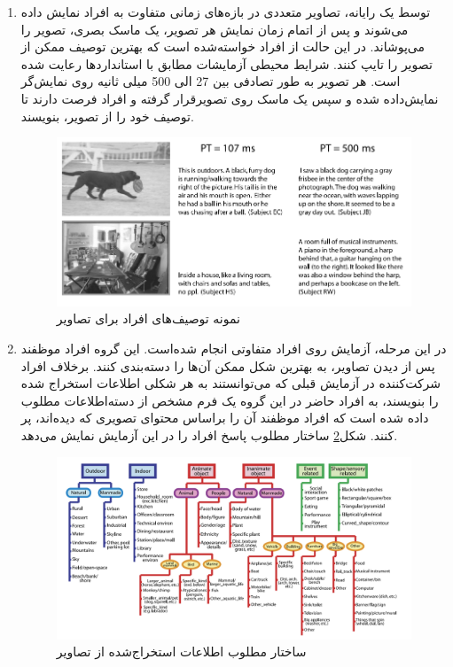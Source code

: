 \begin{enumerate}
	\item توسط یک رایانه، تصاویر متعددی در بازه‌های زمانی متفاوت به افراد نمایش داده می‌شوند و پس از اتمام زمان نمایش هر تصویر، یک ماسک بصری، تصویر را می‌پوشاند. در این حالت از افراد خواسته‌شده  است که بهترین توصیف ممکن از تصویر را تایپ کنند. شرایط محیطی آزمایشات مطابق با استانداردها رعایت شده است. هر تصویر به طور تصادفی بین 27 الی 500 میلی ثانیه روی نمایش‌گر نمایش‌داده شده و سپس یک ماسک روی تصویرقرار گرفته و افراد فرصت دارند تا توصیف خود را از تصویر، بنویسند.
	
	
	\begin{figure}[h]
		\center
		\includegraphics[scale=0.5]{./Imgs/fei2007we_res2.png}
		\caption[نمونه توصیف‌های افراد برای تصاویر]{نمونه‌ توصیف‌های افراد برای تصاویر\cite{fei2007we}}
		\label{fig:f2007we1}
	\end{figure}
	
	
	
	\item در این مرحله، آزمایش روی افراد متفاوتی انجام شده‌است. این گروه افراد موظفند پس از دیدن تصاویر، به بهترین شکل ممکن آن‌ها را دسته‌بندی کنند. برخلاف افراد شرکت‌کننده در آزمایش قبلی  که می‌توانستند به هر شکلی اطلاعات استخراج شده را بنویسند، به افراد حاضر در این گروه یک فرم مشخص از دسته‌اطلاعات مطلوب داده شده است که افراد موظفند آن را براساس محتوای تصویری که دیده‌اند، پر کنند. شکل\ref{fig:f2007we2}
	ساختار مطلوب پاسخ افراد را در این آزمایش نمایش می‌دهد.
	
	\begin{figure}[h]
		\center
		\includegraphics[scale=0.4]{./Imgs/fei2007we_exp1.png}
		\caption{ساختار مطلوب اطلاعات استخراج‌شده از تصاویر\cite{fei2007we}}
		\label{fig:f2007we2}
	\end{figure}
	

\end{enumerate}
